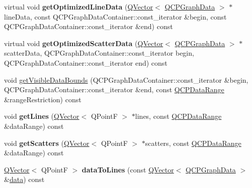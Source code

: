 \begin{DoxyCompactItemize}
\item 
virtual void {\bfseries get\+Optimized\+Line\+Data} (\hyperlink{class_q_vector}{Q\+Vector}$<$ \hyperlink{class_q_c_p_graph_data}{Q\+C\+P\+Graph\+Data} $>$ $\ast$line\+Data, const Q\+C\+P\+Graph\+Data\+Container\+::const\+\_\+iterator \&begin, const Q\+C\+P\+Graph\+Data\+Container\+::const\+\_\+iterator \&end) const \hypertarget{class_q_c_p_graph_a888f1f7b6cd598c7f30bd812f30ebe89}{}\label{class_q_c_p_graph_a888f1f7b6cd598c7f30bd812f30ebe89}

\item 
virtual void {\bfseries get\+Optimized\+Scatter\+Data} (\hyperlink{class_q_vector}{Q\+Vector}$<$ \hyperlink{class_q_c_p_graph_data}{Q\+C\+P\+Graph\+Data} $>$ $\ast$scatter\+Data, Q\+C\+P\+Graph\+Data\+Container\+::const\+\_\+iterator begin, Q\+C\+P\+Graph\+Data\+Container\+::const\+\_\+iterator end) const \hypertarget{class_q_c_p_graph_af9f0c50d187fb6bc8a5164985460a894}{}\label{class_q_c_p_graph_af9f0c50d187fb6bc8a5164985460a894}

\item 
void \hyperlink{class_q_c_p_graph_a687d370a9fbe8d4345dd6387870a198d}{get\+Visible\+Data\+Bounds} (Q\+C\+P\+Graph\+Data\+Container\+::const\+\_\+iterator \&begin, Q\+C\+P\+Graph\+Data\+Container\+::const\+\_\+iterator \&end, const \hyperlink{class_q_c_p_data_range}{Q\+C\+P\+Data\+Range} \&range\+Restriction) const 
\item 
void {\bfseries get\+Lines} (\hyperlink{class_q_vector}{Q\+Vector}$<$ Q\+PointF $>$ $\ast$lines, const \hyperlink{class_q_c_p_data_range}{Q\+C\+P\+Data\+Range} \&data\+Range) const \hypertarget{class_q_c_p_graph_a4827cc8402023cceec56bc2e59915565}{}\label{class_q_c_p_graph_a4827cc8402023cceec56bc2e59915565}

\item 
void {\bfseries get\+Scatters} (\hyperlink{class_q_vector}{Q\+Vector}$<$ Q\+PointF $>$ $\ast$scatters, const \hyperlink{class_q_c_p_data_range}{Q\+C\+P\+Data\+Range} \&data\+Range) const \hypertarget{class_q_c_p_graph_affcf992b16846f43f55500c910d197c8}{}\label{class_q_c_p_graph_affcf992b16846f43f55500c910d197c8}

\item 
\hyperlink{class_q_vector}{Q\+Vector}$<$ Q\+PointF $>$ {\bfseries data\+To\+Lines} (const \hyperlink{class_q_vector}{Q\+Vector}$<$ \hyperlink{class_q_c_p_graph_data}{Q\+C\+P\+Graph\+Data} $>$ \&\hyperlink{class_q_c_p_graph_a04514a2b1fb61a280ead66abe80b89ab}{data}) const \hypertarget{class_q_c_p_graph_ad3d0a20bcf390698f6b14e3dc20a4c33}{}\label{class_q_c_p_graph_ad3d0a20bcf390698f6b14e3dc20a4c33}


\end{DoxyCompactItemize}
